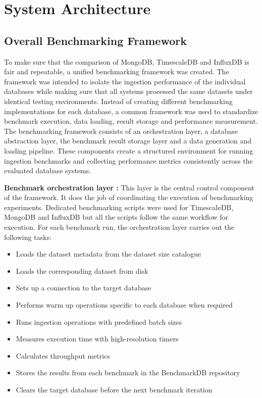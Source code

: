 \section{System Architecture}

\subsection{Overall Benchmarking Framework}

To make sure that the comparison of MongoDB, TimescaleDB and InfluxDB is fair and repeatable, a unified benchmarking framework was created. The framework was intended to isolate the ingestion performance of the individual databases while making sure that all systems processed the same datasets under identical testing environments. Instead of creating different benchmarking implementations for each database, a common framework was used to standardize benchmark execution, data loading, result storage and performance measurement. The benchmarking framework consists of an orchestration layer, a database abstraction layer, the benchmark result storage layer and a data generation and loading pipeline. These components create a structured environment for running ingestion benchmarks and collecting performance metrics consistently across the evaluated database systems. 

\textbf{Benchmark orchestration layer :} 
This layer is the central control component of the framework. It does the job of coordinating the execution of benchmarking experiments. Dedicated benchmarking scripts were used for TimescaleDB, MongoDB and InfluxDB but all the scripts follow the same workflow for execution. For each benchmark run, the orchestration layer carries out the following tasks:

\begin{itemize}
    \item Loads the dataset metadata from the dataset size catalogue
    \item Loads the corresponding dataset from disk
    \item Sets up a connection to the target database
    \item Performs warm up operations specific to each database when required
    \item Runs ingestion operations with predefined batch sizes
    \item Measures execution time with high-resolution timers
    \item Calculates throughput metrics
    \item Stores the results from each benchmark in the BenchmarkDB repository
    \item Clears the target database before the next benchmark iteration
\end{itemize}


